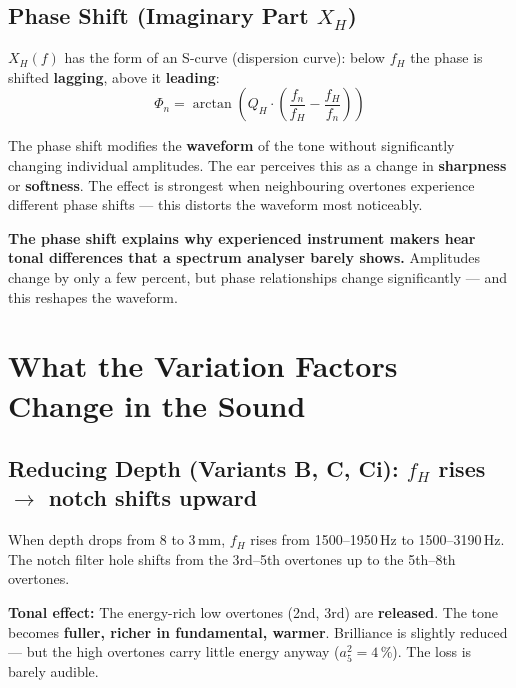 \documentclass[11pt,a4paper]{article}
\begin{document}
\subsection{Phase Shift (Imaginary Part $X_H$)}

$X_H(f)$ has the form of an S-curve (dispersion curve): below $f_H$ the phase is shifted \textbf{lagging}, above it \textbf{leading}:
\begin{equation}
\Phi_n = \arctan\!\left(Q_H \cdot \left(\frac{f_n}{f_H} - \frac{f_H}{f_n}\right)\right)
\end{equation}

The phase shift modifies the \textbf{waveform} of the tone without significantly changing individual amplitudes. The ear perceives this as a change in \textbf{sharpness} or \textbf{softness}. The effect is strongest when neighbouring overtones experience different phase shifts --- this distorts the waveform most noticeably.

\begin{warnbox}
\textbf{The phase shift explains why experienced instrument makers hear tonal differences that a spectrum analyser barely shows.} Amplitudes change by only a few percent, but phase relationships change significantly --- and this reshapes the waveform.
\end{warnbox}


\section{What the Variation Factors Change in the Sound}

\subsection{Reducing Depth (Variants B, C, Ci): $f_H$ rises $\to$ notch shifts upward}

When depth drops from 8 to 3\,mm, $f_H$ rises from 1500--1950\,Hz to 1500--3190\,Hz. The notch filter hole shifts from the 3rd--5th overtones up to the 5th--8th overtones.

\textbf{Tonal effect:} The energy-rich low overtones (2nd, 3rd) are \textbf{released}. The tone becomes \textbf{fuller, richer in fundamental, warmer}. Brilliance is slightly reduced --- but the high overtones carry little energy anyway ($a_5^2 = 4\,\%$). The loss is barely audible.
\end{document}
